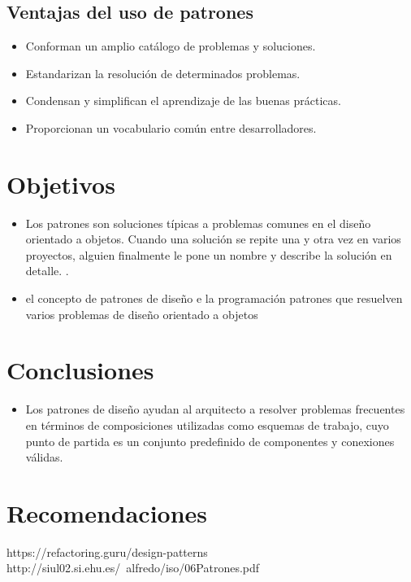 \documentclass[twoside,twocolumn]{article}
\begin{document}
\subsection{Ventajas del uso de patrones}

\begin{itemize}
	\item Conforman un amplio catálogo de problemas y soluciones.
	\item Estandarizan la resolución de determinados problemas.
	\item Condensan y simplifican el aprendizaje de las buenas prácticas.
	\item Proporcionan un vocabulario común entre desarrolladores.
	
\end{itemize}

\section{Objetivos}

\begin{itemize}
\item  Los patrones son soluciones típicas a problemas comunes en el diseño orientado a objetos. Cuando una solución se repite una y otra vez en varios proyectos, alguien finalmente le pone un nombre y describe la solución en detalle. .
\item el concepto de patrones de diseño e la programación
patrones que resuelven varios problemas de diseño orientado a objetos



\end{itemize}




\section{Conclusiones}\label{sec:6}
\begin{itemize}
	\item Los patrones de diseño ayudan al arquitecto a resolver problemas frecuentes en términos de composiciones utilizadas como esquemas de trabajo, cuyo punto de partida es un conjunto predefinido de componentes y conexiones válidas.
\end{itemize}
\section{Recomendaciones}\label{sec:7}




https://refactoring.guru/design-patterns
http://siul02.si.ehu.es/~alfredo/iso/06Patrones.pdf
\end{document}
